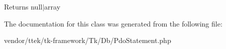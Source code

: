 \begin{DoxyReturn}{Returns}
null$\vert$array 
\end{DoxyReturn}


The documentation for this class was generated from the following file\+:\begin{DoxyCompactItemize}
\item 
vendor/ttek/tk-\/framework/\+Tk/\+Db/Pdo\+Statement.\+php\end{DoxyCompactItemize}
